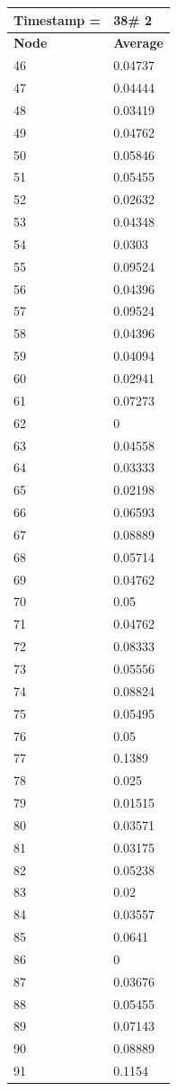 \begin{tabular}{|l||l|}
\hline
\textbf{Timestamp =} & \textbf{38}\# 2\\\hline
	\textbf{Node} & \textbf{Average} \\ \hline
\hline
	46 & 0.04737 \\ \hline
	47 & 0.04444 \\ \hline
	48 & 0.03419 \\ \hline
	49 & 0.04762 \\ \hline
	50 & 0.05846 \\ \hline
	51 & 0.05455 \\ \hline
	52 & 0.02632 \\ \hline
	53 & 0.04348 \\ \hline
	54 & 0.0303 \\ \hline
	55 & 0.09524 \\ \hline
	56 & 0.04396 \\ \hline
	57 & 0.09524 \\ \hline
	58 & 0.04396 \\ \hline
	59 & 0.04094 \\ \hline
	60 & 0.02941 \\ \hline
	61 & 0.07273 \\ \hline
	62 & 0 \\ \hline
	63 & 0.04558 \\ \hline
	64 & 0.03333 \\ \hline
	65 & 0.02198 \\ \hline
	66 & 0.06593 \\ \hline
	67 & 0.08889 \\ \hline
	68 & 0.05714 \\ \hline
	69 & 0.04762 \\ \hline
	70 & 0.05 \\ \hline
	71 & 0.04762 \\ \hline
	72 & 0.08333 \\ \hline
	73 & 0.05556 \\ \hline
	74 & 0.08824 \\ \hline
	75 & 0.05495 \\ \hline
	76 & 0.05 \\ \hline
	77 & 0.1389 \\ \hline
	78 & 0.025 \\ \hline
	79 & 0.01515 \\ \hline
	80 & 0.03571 \\ \hline
	81 & 0.03175 \\ \hline
	82 & 0.05238 \\ \hline
	83 & 0.02 \\ \hline
	84 & 0.03557 \\ \hline
	85 & 0.0641 \\ \hline
	86 & 0 \\ \hline
	87 & 0.03676 \\ \hline
	88 & 0.05455 \\ \hline
	89 & 0.07143 \\ \hline
	90 & 0.08889 \\ \hline
	91 & 0.1154 \\ \hline
\end{tabular}
